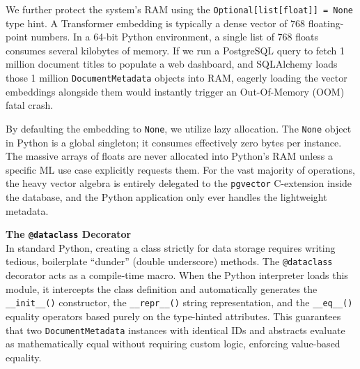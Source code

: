 We further protect the system's RAM using the \texttt{Optional[list[float]] = None} type hint. A Transformer embedding is typically a dense vector of $768$ floating-point numbers. In a 64-bit Python environment, a single list of 768 floats consumes several kilobytes of memory. If we run a PostgreSQL query to fetch 1 million document titles to populate a web dashboard, and SQLAlchemy loads those 1 million \texttt{DocumentMetadata} objects into RAM, eagerly loading the vector embeddings alongside them would instantly trigger an Out-Of-Memory (OOM) fatal crash.

By defaulting the embedding to \texttt{None}, we utilize lazy allocation. The \texttt{None} object in Python is a global singleton; it consumes effectively zero bytes per instance. The massive arrays of floats are never allocated into Python's RAM unless a specific ML use case explicitly requests them. For the vast majority of operations, the heavy vector algebra is entirely delegated to the \texttt{pgvector} C-extension inside the database, and the Python application only ever handles the lightweight metadata.


\textbf{The \texttt{@dataclass} Decorator} \\
In standard Python, creating a class strictly for data storage requires writing tedious, boilerplate ``dunder'' (double underscore) methods. The \texttt{@dataclass} decorator acts as a compile-time macro. When the Python interpreter loads this module, it intercepts the class definition and automatically generates the \texttt{\_\_init\_\_()} constructor, the \texttt{\_\_repr\_\_()} string representation, and the \texttt{\_\_eq\_\_()} equality operators based purely on the type-hinted attributes. This guarantees that two \texttt{DocumentMetadata} instances with identical IDs and abstracts evaluate as mathematically equal without requiring custom logic, enforcing value-based equality.









